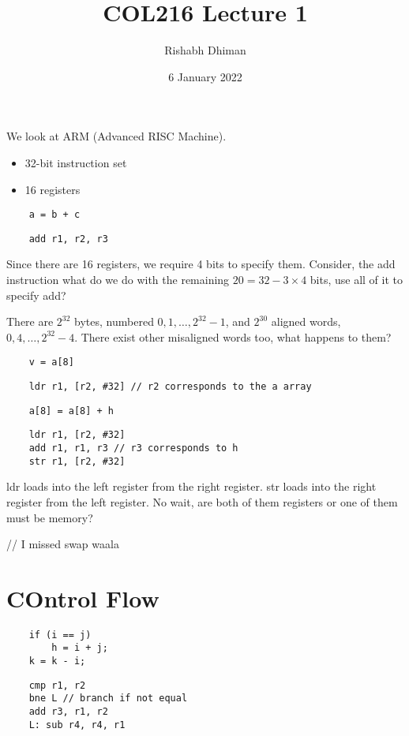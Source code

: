 \documentclass{scrartcl}
\title{COL216 Lecture 1}
\author{Rishabh Dhiman}
\date{6 January 2022}
\begin{document}
\maketitle

We look at ARM (Advanced RISC Machine).
\begin{itemize}
	\item 32-bit instruction set
	\item 16 registers
\end{itemize}

\begin{lstlisting}
	a = b + c
\end{lstlisting}
\begin{lstlisting}
	add r1, r2, r3
\end{lstlisting}

Since there are 16 registers, we require 4 bits to specify them. Consider, the add instruction what do we do with the remaining $20 = 32 - 3 \times 4$ bits, use all of it to specify add?

There are $2^{32}$ bytes, numbered $0, 1, \dots, 2^{32} - 1$, and $2^{30}$ aligned words, $0, 4, \dots, 2^{32} - 4$. There exist other misaligned words too, what happens to them?

\begin{lstlisting}
	v = a[8]
\end{lstlisting}
\begin{lstlisting}
	ldr r1, [r2, #32] // r2 corresponds to the a array
\end{lstlisting}

\begin{lstlisting}
	a[8] = a[8] + h
\end{lstlisting}
\begin{lstlisting}
	ldr r1, [r2, #32]
	add r1, r1, r3 // r3 corresponds to h
	str r1, [r2, #32]
\end{lstlisting}
ldr loads into the left register from the right register. str loads into the right register from the left register. No wait, are both of them registers or one of them must be memory?

// I missed swap waala

\section{COntrol Flow}
\begin{lstlisting}
	if (i == j)
		h = i + j;
	k = k - i;
\end{lstlisting}
\begin{lstlisting}
	cmp r1, r2
	bne L // branch if not equal
	add r3, r1, r2
	L: sub r4, r4, r1
\end{lstlisting}
\end{document}
